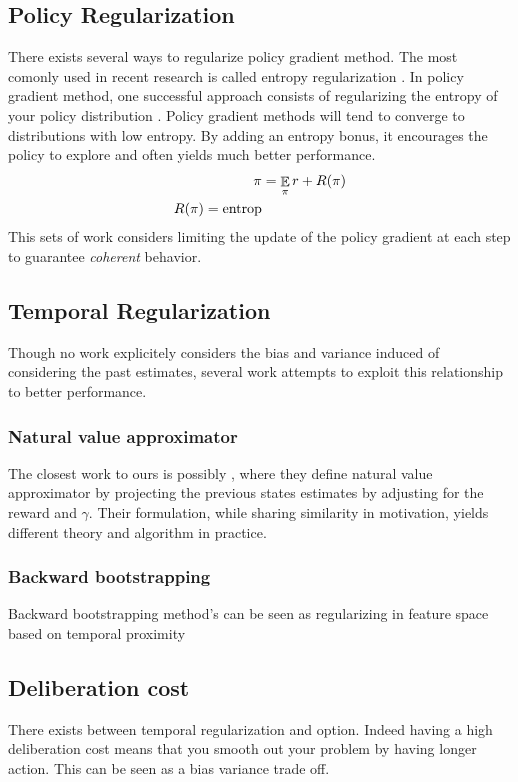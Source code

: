 \subsection{Policy Regularization}
There exists several ways to regularize policy gradient method. The most comonly used in recent research is called entropy regularization \citep{neu2017unified,schulman2017proximal,bartlett2009regal}.
In policy gradient method, one successful approach consists of regularizing the entropy of your policy distribution \citep{neu2017unified}. Policy gradient methods will tend to converge to distributions with low entropy. By adding an entropy bonus, it encourages the policy to explore and often yields much better performance.
\begin{equation}
\begin{split}
    \pi &= \mathop{\mathbb{E}}_{\pi}{r} + R(\pi)\\
    R(\pi) = \text{entrop}
\end{split}
\end{equation}
This sets of work \citep{schulman2017proximal,schulman2015trust} considers limiting the update of the policy gradient at each step to guarantee \emph{coherent} behavior. 


\subsection{Temporal Regularization}
Though no work explicitely considers the bias and variance induced of considering the past estimates, several work attempts to exploit this relationship to better performance.
\subsubsection{Natural value approximator}
The closest work to ours is possibly \citep{xu2017natural}, where they define natural value approximator by projecting the previous states estimates by adjusting for the reward and $\gamma$. Their formulation, while sharing similarity in motivation, yields different theory and algorithm in practice.
\subsubsection{Backward bootstrapping}
Backward bootstrapping method's can be seen as regularizing in feature space based on temporal proximity \citep{sutton2009fast,li2008worst,baird1995residual}
\subsection{Deliberation cost}
There exists between temporal regularization and option. Indeed having a high deliberation cost \citep{harb2017waiting} means that you smooth out your problem by having longer action. This can be seen as a bias variance trade off. 
